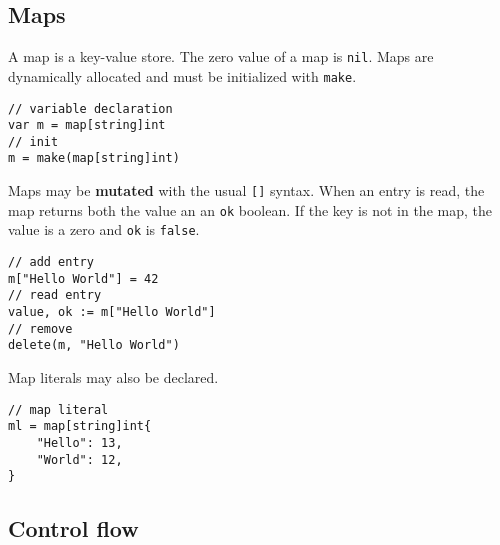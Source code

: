 \documentclass{article}
\begin{document}
\subsection{Maps}
\begin{paracol}{2}

A map is a key-value store. The zero value of a map is \lstinline|nil|. Maps are dynamically allocated and must be initialized with \lstinline|make|.
    
\switchcolumn
\begin{lstlisting}
// variable declaration
var m = map[string]int
// init
m = make(map[string]int)
\end{lstlisting}

\switchcolumn*
\noindent Maps may be \textbf{mutated} with the usual \lstinline|[]| syntax. When an entry is read, the map returns both the value an an \lstinline|ok| boolean. If the key is not in the map, the value is a zero and \lstinline|ok| is \lstinline|false|.

\switchcolumn
\begin{lstlisting}
// add entry
m["Hello World"] = 42
// read entry
value, ok := m["Hello World"]
// remove
delete(m, "Hello World")
\end{lstlisting}
\switchcolumn*
\noindent Map literals may also be declared.

\switchcolumn
\begin{lstlisting}
// map literal
ml = map[string]int{
    "Hello": 13,
    "World": 12,
}
\end{lstlisting}

\end{paracol}

\subsection{Control flow}
\end{document}
